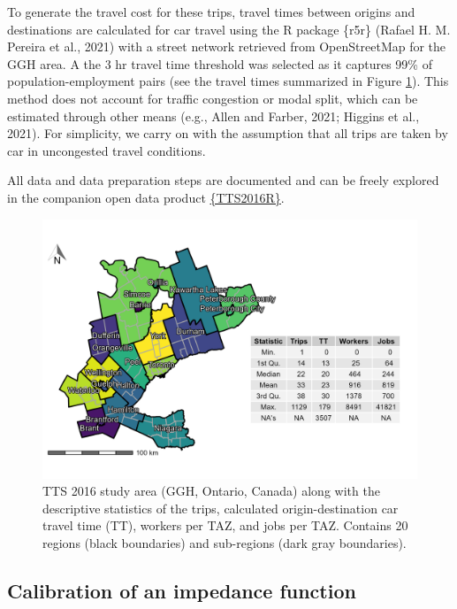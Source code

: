 \documentclass[]{elsarticle} %
\begin{document}
To generate the travel cost for these trips, travel times between
origins and destinations are calculated for car travel using the R
package \{r5r\} (Rafael H. M. Pereira et al., 2021) with a street
network retrieved from OpenStreetMap for the GGH area. A the 3 hr travel
time threshold was selected as it captures 99\% of population-employment
pairs (see the travel times summarized in Figure
\ref{fig:TTS-16-survey-area}). This method does not account for traffic
congestion or modal split, which can be estimated through other means
(e.g., Allen and Farber, 2021; Higgins et al., 2021). For simplicity, we
carry on with the assumption that all trips are taken by car in
uncongested travel conditions.

All data and data preparation steps are documented and can be freely
explored in the companion open data product
\href{https://github.com/soukhova/TTS2016R}{\{TTS2016R\}}.

\begin{figure}

{\centering \includegraphics[width=0.8\linewidth]{images/TTS16-survey-area} 

}

\caption{\label{fig:TTS-16-survey-area}TTS 2016 study area (GGH, Ontario, Canada) along with the descriptive statistics of the trips, calculated origin-destination car travel time (TT), workers per TAZ, and jobs per TAZ. Contains 20 regions (black boundaries) and sub-regions (dark gray boundaries).}\label{fig:TTS-16-survey-area}
\end{figure}

\hypertarget{calibration-of-an-impedance-function}{%
\subsection{Calibration of an impedance
function}\label{calibration-of-an-impedance-function}}
\end{document}
